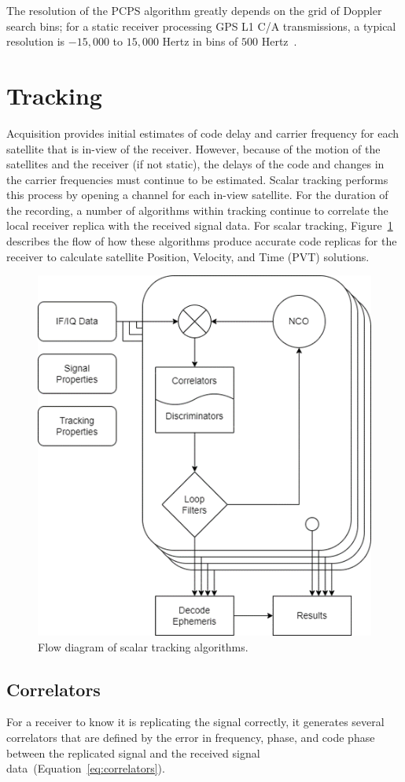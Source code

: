 The resolution of the PCPS algorithm greatly depends on the grid of Doppler search bins; for a static receiver processing GPS L1 C/A transmissions, a typical resolution is \(-15,000\) to \(15,000\) Hertz in bins of \(500\) Hertz~\cite{scottRapidSignalAcquisition2001}.

\section{\textbf{Tracking}}
Acquisition provides initial estimates of code delay and carrier frequency for each satellite that is in-view of the receiver. However, because of the motion of the satellites and the receiver (if not static), the delays of the code and changes in the carrier frequencies must continue to be estimated. Scalar tracking performs this process by opening a channel for each in-view satellite. For the duration of the recording, a number of algorithms within tracking continue to correlate the local receiver replica with the received signal data. For scalar tracking, Figure~\ref{fig:scalartracking} describes the flow of how these algorithms produce accurate code replicas for the receiver to calculate satellite Position, Velocity, and Time (PVT) solutions.

\begin{figure}[!ht]
    \centering
    \includegraphics[width=0.5\linewidth]{Figures/scalartracking.png}
    \caption{Flow diagram of scalar tracking algorithms.}\label{fig:scalartracking}
\end{figure}

\subsection{\textbf{Correlators}}
For a receiver to know it is replicating the signal correctly, it generates several correlators that are defined by the error in frequency, phase, and code phase between the replicated signal and the received signal data~(Equation~\ref{eq:correlators}).

